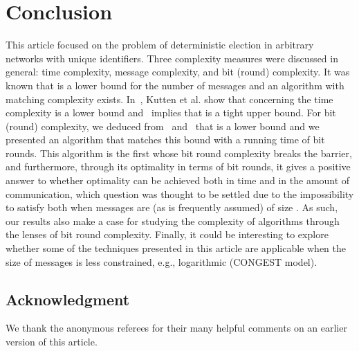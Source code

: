 \documentclass[11pt,envcountsame,letterpaper]{llncs}
\begin{document}
\section{Conclusion}
\label{sec:conclusion}
This article focused on the problem of deterministic election in arbitrary networks with unique identifiers. Three complexity measures were discussed in general: time complexity, message complexity, and bit (round) complexity.
It was known that  is a lower bound for the number of messages and an algorithm with matching complexity exists.
In~\cite{KPPRT15}, Kutten et al. show that concerning the time
complexity  is a lower bound and~\cite{Peleg90} implies that
 is a tight upper bound. 
For bit (round) complexity, we deduced from~\cite{KPPRT15} and~\cite{DS07}
that   is a lower bound and we presented 
an algorithm that matches this bound with a running time of  bit rounds. This algorithm is the first whose bit round complexity breaks the  barrier, and furthermore, through its optimality in terms of bit rounds, it gives a positive answer to whether optimality can be
achieved
both in time and in the amount of communication, which question was thought to be settled due to the impossibility to satisfy both when messages are (as is frequently assumed) of size . As such, our results also make a case for studying the complexity of algorithms through the lenses of bit round complexity. Finally, it could be interesting to explore whether some of the techniques presented in this article are applicable when the size of messages is less constrained, e.g., logarithmic (CONGEST model).

\subsection*{Acknowledgment} We thank the anonymous referees for their many helpful comments on an earlier version of this article.



\end{document}
